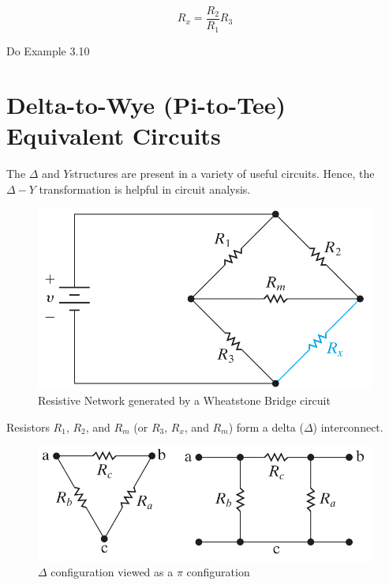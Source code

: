 \documentclass[14pt]{memoir}
\begin{document}
\begin{equation}
R_x = \frac{R_2}{R_1}R_3
\end{equation}

\begin{tcolorbox}
Do Example 3.10
\end{tcolorbox}


\section{Delta-to-Wye (Pi-to-Tee) Equivalent Circuits}

The $\Delta$ and $Y$structures are present in a variety of useful circuits. Hence, the $\Delta-Y$  transformation is helpful in circuit analysis. 

\begin{figure}[H]
\begin{center}
\includegraphics[scale=0.50]{fig/fig03_31.png}
\caption{Resistive Network generated by a Wheatstone Bridge circuit}
\label{fig:fig03_31}
\end{center}
\end{figure}

Resistors $R_1$, $R_2$, and $R_m$ (or $R_3$, $R_x$, and $R_m$) form a delta ($\Delta$) interconnect. 

\begin{figure}[H]
\begin{center}
\includegraphics[scale=0.50]{fig/fig03_32.png}
\caption{$\Delta$ configuration viewed as a $\pi$ configuration}
\label{fig:fig03_32}
\end{center}
\end{figure}
\end{document}
